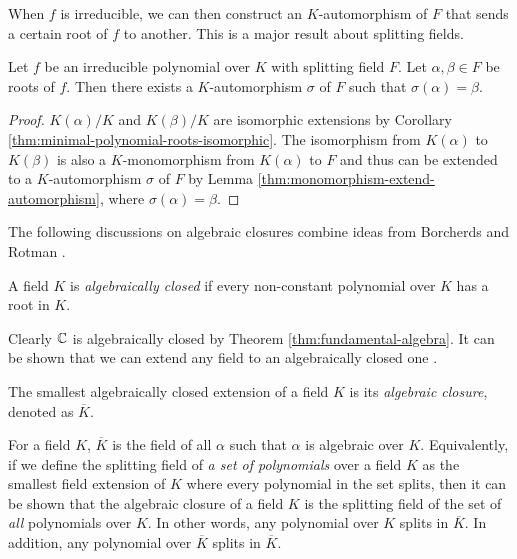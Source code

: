 When $f$ is irreducible, we can then construct an $K$-automorphism of $F$ that sends a certain root of $f$ to another. This is a major result about splitting fields. 

\begin{theorem} \label{thm:automorphism-from-zeros}
	Let $f$ be an irreducible polynomial over $K$ with splitting field $F$. Let $\alpha, \beta \in F$ be roots of $f$. Then there exists a $K$-automorphism $\sigma$ of $F$ such that $\sigma(\alpha) = \beta$. 
\end{theorem}

\begin{proof}
	$K(\alpha)/K$ and $K(\beta)/K$ are isomorphic extensions by Corollary \ref{thm:minimal-polynomial-roots-isomorphic}. The isomorphism from $K(\alpha)$ to $K(\beta)$ is also a $K$-monomorphism from $K(\alpha)$ to $F$ and thus can be extended to a $K$-automorphism $\sigma$ of $F$ by Lemma \ref{thm:monomorphism-extend-automorphism}, where $\sigma(\alpha) = \beta$.
\end{proof}

The following discussions on algebraic closures combine ideas from Borcherds \cite[Lecture~4]{galois-theory-lectures} and Rotman \cite[p.~89]{rotman_galois_1998}. 

\begin{definition}
	A field $K$ is \textit{algebraically closed} if every non-constant polynomial over $K$ has a root in $K$. 
\end{definition}

Clearly $\mathbb C$ is algebraically closed by Theorem \ref{thm:fundamental-algebra}. It can be shown that we can extend any field to an algebraically closed one \cite[p.~89]{rotman_galois_1998}. 

\begin{definition}
	The smallest algebraically closed extension of a field $K$ is its \textit{algebraic closure}, denoted as $\overline K$.
\end{definition}



For a field $K$, $\overline K$ is the field of all $\alpha$ such that $\alpha$ is algebraic over $K$. Equivalently, if we define the splitting field of \textit{a set of polynomials} over a field $K$ as the smallest field extension of $K$ where every polynomial in the set splits, then it can be shown that the algebraic closure of a field $K$ is the splitting field of the set of \textit{all} polynomials over $K$. In other words, any polynomial over $K$ splits in $\overline K$. In addition, any polynomial over $\overline K$ splits in $\overline K$.

